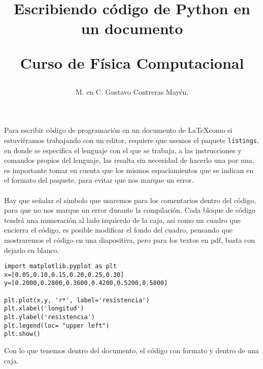 \documentclass[12pt]{article}
\author{M. en C. Gustavo Contreras May\'{e}n.}
\title{Escribiendo código de Python en un documento \\ \begin{Large} Curso de Física Computacional\end{Large} }
\date{ }
\begin{document}
\maketitle
\fontsize{14}{14}\selectfont
Para escribir código de programación en un documento de \LaTeX como si estuviéramos trabajando con un editor, requiere que usemos el paquete \texttt{listings}, en donde se especifica el lenguaje con el que se trabaja, a las instrucciones y comandos propios del lenguaje, las resalta sin necesidad de hacerlo una por una, es importante tomar en cuenta que los mismos espaciamientos que se indican en el formato del paquete, para evitar que nos marque un error.
\\
\\
Hay que señalar el símbolo que usaremos para los comentarios dentro del código, para que no nos marque un error durante la compilación. Cada bloque de código tendrá una numeración al lado izquierdo de la caja, así como un cuadro que encierra el código, es posible modificar el fondo del cuadro, pensando que mostraremos el código en una diapositiva, pero para los textos en pdf, basta con dejarlo en blanco.
\begin{lstlisting}
import matplotlib.pyplot as plt
x=[0.05,0.10,0.15,0.20,0.25,0.30]
y=[0.2000,0.2800,0.3600,0.4200,0.5200,0.5800]

plt.plot(x,y, 'r*', label='resistencia')
plt.xlabel('longitud')
plt.ylabel('resistencia')
plt.legend(loc= "upper left")
plt.show()
\end{lstlisting}
Con lo que tenemos dentro del documento, el código con formato y dentro de una caja.
\end{document}
